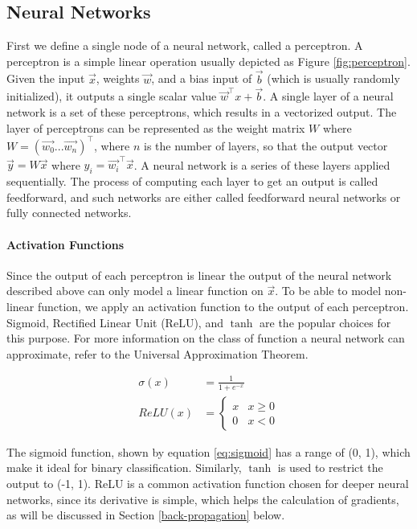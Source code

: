 \documentclass[12pt,a4paper,]{report}
\begin{document}
\hypertarget{neural-networks}{%
\subsection{Neural Networks}\label{neural-networks}}

First we define a single node of a neural network, called a perceptron.
A perceptron is a simple linear operation usually depicted as Figure
\ref{fig:perceptron}. Given the input \(\vec{x}\), weights \(\vec{w}\),
and a bias input of \(\vec{b}\) (which is usually randomly initialized),
it outputs a single scalar value \(\vec{w}^\intercal x + \vec{b}\). A
single layer of a neural network is a set of these perceptrons, which
results in a vectorized output. The layer of perceptrons can be
represented as the weight matrix \(W\) where
\(W = (\vec{w_0} ... \vec{w_n})^\intercal\), where \(n\) is the number
of layers, so that the output vector \(\vec{y} = W \vec{x}\) where
\(y_i = \vec{w_i}^\intercal \vec{x}\). A neural network is a series of
these layers applied sequentially. The process of computing each layer
to get an output is called feedforward, and such networks are either
called feedforward neural networks or fully connected networks.

\paragraph{Activation Functions}

Since the output of each perceptron is linear the output of the neural
network described above can only model a linear function on \(\vec{x}\).
To be able to model non-linear function, we apply an activation function
to the output of each perceptron. Sigmoid, Rectified Linear Unit (ReLU),
and \(\tanh\) are the popular choices for this purpose. For more
information on the class of function a neural network can approximate,
refer to the Universal Approximation Theorem.

\begin{align}
    \sigma(x) &= \frac{1}{1 + e^{-x}} \label{eq:sigmoid} \\
    ReLU(x) &= \begin{cases}
        x & x \geq 0 \\
        0 & x < 0
    \end{cases} 
\end{align}

The sigmoid function, shown by equation \ref{eq:sigmoid} has a range of
(0, 1), which make it ideal for binary classification. Similarly,
\(\tanh\) is used to restrict the output to (-1, 1). ReLU is a common
activation function chosen for deeper neural networks, since its
derivative is simple, which helps the calculation of gradients, as will
be discussed in Section \ref{back-propagation} below.
\end{document}
